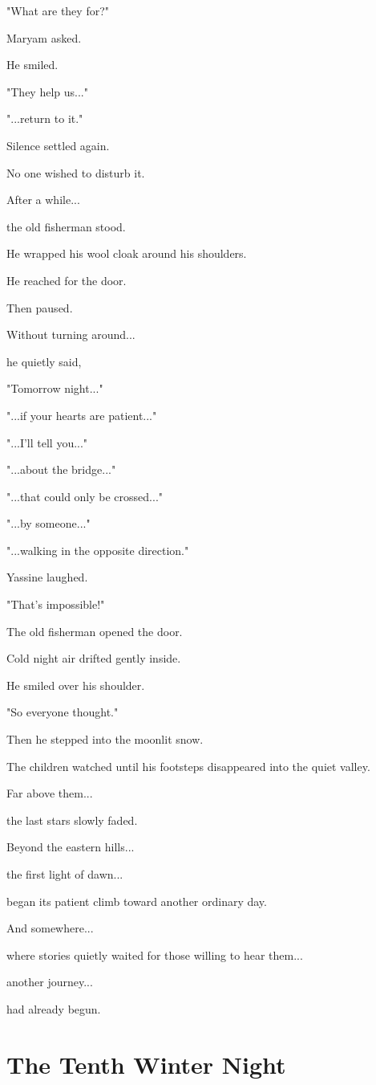\documentclass[12pt,openany]{book}
\begin{document}
"What are they for?"

Maryam asked.

He smiled.

"They help us..."

"...return to it."

Silence settled again.

No one wished to disturb it.

After a while...

the old fisherman stood.

He wrapped his wool cloak around his shoulders.

He reached for the door.

Then paused.

Without turning around...

he quietly said,

"Tomorrow night..."

"...if your hearts are patient..."

"...I'll tell you..."

"...about the bridge..."

"...that could only be crossed..."

"...by someone..."

"...walking in the opposite direction."

Yassine laughed.

"That's impossible!"

The old fisherman opened the door.

Cold night air drifted gently inside.

He smiled over his shoulder.

"So everyone thought."

Then he stepped into the moonlit snow.

The children watched until his footsteps disappeared into the quiet valley.

Far above them...

the last stars slowly faded.

Beyond the eastern hills...

the first light of dawn...

began its patient climb toward another ordinary day.

And somewhere...

where stories quietly waited for those willing to hear them...

another journey...

had already begun.
\chapter{The Tenth Winter Night}
\end{document}
